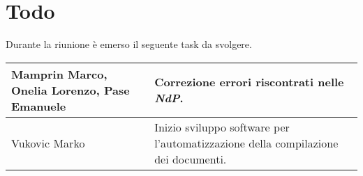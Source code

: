 \section{Todo}
Durante la riunione è emerso il seguente task da svolgere.

\begin{center}
  \begin{tabular}{|p{5cm}|p{7cm}|}
    \hline
    Mamprin Marco, Onelia Lorenzo, Pase Emanuele & Correzione errori riscontrati nelle \textit{NdP}.  \\ \hline
    Vukovic Marko & Inizio sviluppo software per l'automatizzazione della compilazione dei documenti. \\ \hline
  \end{tabular}
\end{center}

